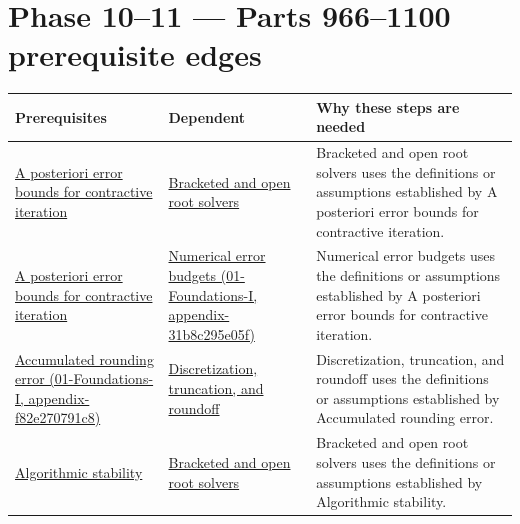 \section{Phase 10--11 --- Parts 966--1100 prerequisite edges}\label{appendix-4ad47bdd269a-phase-1011-parts-9661100-prerequisite-edges}

{\def\LTcaptype{none} %
\begin{longtable}[]{@{}
  >{\raggedright\arraybackslash}p{}
  >{\raggedright\arraybackslash}p{}
  >{\raggedright\arraybackslash}p{}@{}}
\toprule\noalign{}
\begin{minipage}[b]{\linewidth}\raggedright
Prerequisites
\end{minipage} & \begin{minipage}[b]{\linewidth}\raggedright
Dependent
\end{minipage} & \begin{minipage}[b]{\linewidth}\raggedright
Why these steps are needed
\end{minipage} \\
\midrule\noalign{}
\endhead
\bottomrule\noalign{}
\endlastfoot
\hyperref[appendix-d83b0ad1be7f]{A posteriori error bounds for contractive iteration} & \hyperref[appendix-f63eb850796d]{Bracketed and open root solvers} & Bracketed and open root solvers uses the definitions or assumptions established by A posteriori error bounds for contractive iteration. \\
\hyperref[appendix-d83b0ad1be7f]{A posteriori error bounds for contractive iteration} & \href{../01-Foundations-I/main.pdf\#nameddest=appendix-31b8c295e05f}{Numerical error budgets (01-Foundations-I, appendix-31b8c295e05f)} & Numerical error budgets uses the definitions or assumptions established by A posteriori error bounds for contractive iteration. \\
\href{../01-Foundations-I/main.pdf\#nameddest=appendix-f82e270791c8}{Accumulated rounding error (01-Foundations-I, appendix-f82e270791c8)} & \hyperref[appendix-6b0648b2b8e8]{Discretization, truncation, and roundoff} & Discretization, truncation, and roundoff uses the definitions or assumptions established by Accumulated rounding error. \\
\hyperref[appendix-aa2bf0d79639]{Algorithmic stability} & \hyperref[appendix-f63eb850796d]{Bracketed and open root solvers} & Bracketed and open root solvers uses the definitions or assumptions established by Algorithmic stability. \\

\end{longtable}}
